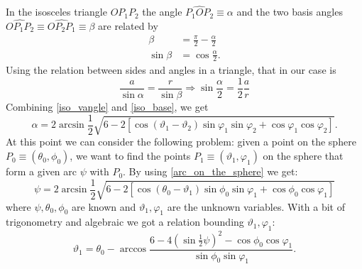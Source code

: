 In the isosceles triangle $OP_1P_2$ the angle $\hat{P_1OP_2} \equiv \alpha $ and the two basis angles $\hat{OP_1P_2} \equiv \hat{OP_2P_1} \equiv \beta$ are related by
\begin{align}
    \beta & = \frac{\pi}{2} - \frac{\alpha}{2} \label{iso_angles}\\
    \sin{\beta} & = \cos{\frac{\alpha}{2}} \label{iso_sin}.
\end{align}
Using the relation between sides and angles in a triangle, that in our case is
\begin{equation}
    \frac{a}{\sin{\alpha}} = \frac{r}{\sin{\beta}} \Rightarrow{} \sin{\frac{\alpha}{2}} = \frac{1}{2}\frac{a}{r} \label{iso_vangle}
\end{equation}
Combining \ref{iso_vangle} and \ref{iso_base}, we get
\begin{equation}
    \alpha = 2 \arcsin \frac{1}{2} \sqrt{6 - 2 \left[ \cos \left( \vartheta_1 - \vartheta_2 \right) \sin \varphi_1 \sin \varphi_2 + \cos \varphi_1 \cos \varphi_2  \right]}. \label{arc_on_the_sphere}
\end{equation}
At this point we can consider the following problem: given a point on the sphere $P_0 \equiv \left( \theta_0 , \phi_0 \right)$, we want to find the points $P_1 \equiv \left( \vartheta_1 , \varphi_1 \right)$ on the sphere that form a given arc $\psi$ with $P_0$. By using \ref{arc_on_the_sphere} we get:
\begin{equation*}
    \psi = 2 \arcsin \frac{1}{2} \sqrt{6 - 2 \left[ \cos \left( \theta_0 - \vartheta_1 \right) \sin \phi_0 \sin \varphi_1 + \cos \phi_0 \cos \varphi_1  \right]}
\end{equation*}
where $\psi,\theta_0,\phi_0$ are known and $\vartheta_1,\varphi_1$ are the unknown variables. With a bit of trigonometry and algebraic we got a relation bounding $\vartheta_1, \varphi_1$:
\begin{equation}
    \vartheta_1 = \theta_0 - \arccos \frac{6-4\left(\sin{\frac{1}{2}\psi}\right)^2 - \cos \phi_0 \cos \varphi_1}{\sin \phi_0 \sin \varphi_1}. \label{relation_theta_phi}
\end{equation}
